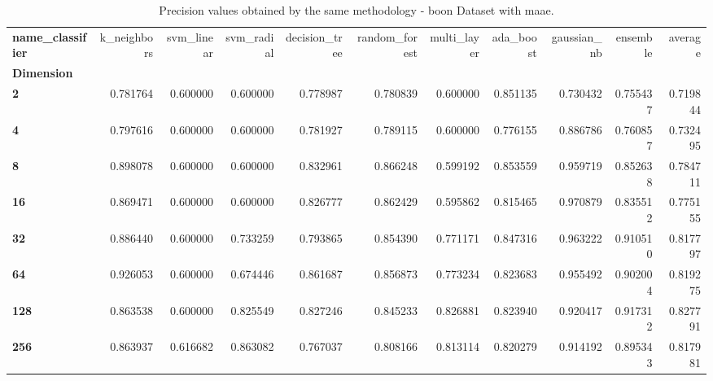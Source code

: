 \begin{table}
\centering
\caption{Precision values obtained by the same methodology - boon Dataset with maae.}
\label{precision_boon_maae-reproduction}
\begin{tabular}{lrrrrrrrrrr}
\toprule
\textbf{name\_classifier} &  k\_neighbors &  svm\_linear &  svm\_radial &  decision\_tree &  random\_forest &  multi\_layer &  ada\_boost &  gaussian\_nb &  ensemble &   average \\
\textbf{Dimension} &              &             &             &                &                &              &            &              &           &           \\
\midrule
\textbf{2        } &     0.781764 &    0.600000 &    0.600000 &       0.778987 &       0.780839 &     0.600000 &   0.851135 &     0.730432 &  0.755437 &  0.719844 \\
\textbf{4        } &     0.797616 &    0.600000 &    0.600000 &       0.781927 &       0.789115 &     0.600000 &   0.776155 &     0.886786 &  0.760857 &  0.732495 \\
\textbf{8        } &     0.898078 &    0.600000 &    0.600000 &       0.832961 &       0.866248 &     0.599192 &   0.853559 &     0.959719 &  0.852638 &  0.784711 \\
\textbf{16       } &     0.869471 &    0.600000 &    0.600000 &       0.826777 &       0.862429 &     0.595862 &   0.815465 &     0.970879 &  0.835512 &  0.775155 \\
\textbf{32       } &     0.886440 &    0.600000 &    0.733259 &       0.793865 &       0.854390 &     0.771171 &   0.847316 &     0.963222 &  0.910510 &  0.817797 \\
\textbf{64       } &     0.926053 &    0.600000 &    0.674446 &       0.861687 &       0.856873 &     0.773234 &   0.823683 &     0.955492 &  0.902004 &  0.819275 \\
\textbf{128      } &     0.863538 &    0.600000 &    0.825549 &       0.827246 &       0.845233 &     0.826881 &   0.823940 &     0.920417 &  0.917312 &  0.827791 \\
\textbf{256      } &     0.863937 &    0.616682 &    0.863082 &       0.767037 &       0.808166 &     0.813114 &   0.820279 &     0.914192 &  0.895343 &  0.817981 \\
\bottomrule
\end{tabular}
\end{table}
